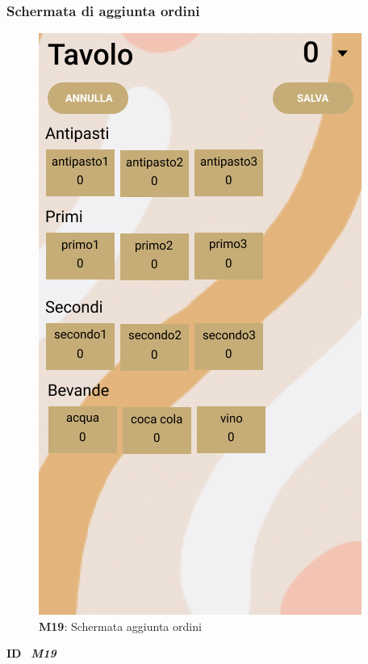                     \subsubsection{Schermata di aggiunta ordini}
                          \begin{figure}[H]
                            \centering
                            \includegraphics[scale=0.4]{assets/Mockup/Mockup_AddOrder.png}
                            \caption*{\textbf{M19}: Schermata aggiunta ordini}\label{fig:Mockup_WaiterDash}
                          \end{figure}
                
                          \begin{flushleft}
                            \textbf{ID}   \ \Large{\textit{\textbf{M19}}}
                          \end{flushleft}
                
